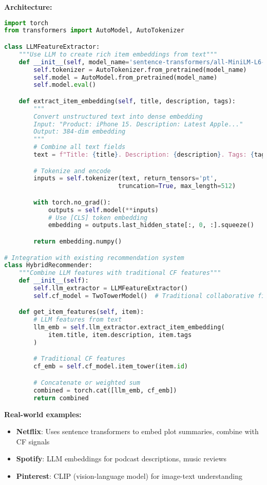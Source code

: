 \documentclass[10pt]{article}
\begin{document}
\textbf{Architecture:}
\begin{lstlisting}[language=Python]
import torch
from transformers import AutoModel, AutoTokenizer

class LLMFeatureExtractor:
    """Use LLM to create rich item embeddings from text"""
    def __init__(self, model_name='sentence-transformers/all-MiniLM-L6-v2'):
        self.tokenizer = AutoTokenizer.from_pretrained(model_name)
        self.model = AutoModel.from_pretrained(model_name)
        self.model.eval()

    def extract_item_embedding(self, title, description, tags):
        """
        Convert unstructured text into dense embedding
        Input: "Product: iPhone 15. Description: Latest Apple..."
        Output: 384-dim embedding
        """
        # Combine all text fields
        text = f"Title: {title}. Description: {description}. Tags: {tags}"

        # Tokenize and encode
        inputs = self.tokenizer(text, return_tensors='pt',
                               truncation=True, max_length=512)

        with torch.no_grad():
            outputs = self.model(**inputs)
            # Use [CLS] token embedding
            embedding = outputs.last_hidden_state[:, 0, :].squeeze()

        return embedding.numpy()

# Integration with existing recommendation system
class HybridRecommender:
    """Combine LLM features with traditional CF features"""
    def __init__(self):
        self.llm_extractor = LLMFeatureExtractor()
        self.cf_model = TwoTowerModel()  # Traditional collaborative filtering

    def get_item_features(self, item):
        # LLM features from text
        llm_emb = self.llm_extractor.extract_item_embedding(
            item.title, item.description, item.tags
        )

        # Traditional CF features
        cf_emb = self.cf_model.item_tower(item.id)

        # Concatenate or weighted sum
        combined = torch.cat([llm_emb, cf_emb])
        return combined
\end{lstlisting}

\textbf{Real-world examples:}
\begin{itemize}
\item \textbf{Netflix}: Uses sentence transformers to embed plot summaries, combine with CF signals
\item \textbf{Spotify}: LLM embeddings for podcast descriptions, music reviews
\item \textbf{Pinterest}: CLIP (vision-language model) for image-text understanding
\end{itemize}
\end{document}
